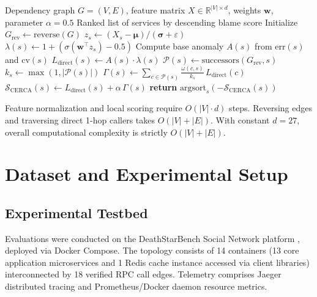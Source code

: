 \documentclass[conference]{IEEEtran}
\begin{document}
\begin{algorithm}[!t]
\caption{CERCA Root Cause Inference}
\label{alg:cerca}
\begin{algorithmic}[1]
\REQUIRE Dependency graph $G=(V,E)$, feature matrix $X\in\mathbb{R}^{|V|\times d}$, weights $\mathbf{w}$, parameter $\alpha=0.5$
\ENSURE Ranked list of services by descending blame score
\STATE Initialize $G_{\mathrm{rev}}\leftarrow \mathrm{reverse}(G)$
    \STATE $z_s\leftarrow(X_s-\boldsymbol{\mu})/(\boldsymbol{\sigma}+\varepsilon)$
    \STATE $\lambda(s)\leftarrow 1+(\sigma(\mathbf{w}^{\top}z_s)-0.5)$
    \STATE Compute base anomaly $A(s)$ from $\mathrm{err}(s)$ and $\mathrm{cv}(s)$
    \STATE $L_{\mathrm{direct}}(s)\leftarrow A(s)\cdot\lambda(s)$
\ENDFOR
{}
    \STATE $\mathcal{P}(s)\leftarrow \mathrm{successors}(G_{\mathrm{rev}}, s)$ 
    \STATE $k_s\leftarrow \max(1, |\mathcal{P}(s)|)$
    \STATE $\Gamma(s)\leftarrow \sum_{c\in\mathcal{P}(s)} \frac{\omega(c,s)}{k_s}\,L_{\mathrm{direct}}(c)$
    \STATE $\mathcal{S}_{\mathrm{CERCA}}(s)\leftarrow L_{\mathrm{direct}}(s)+\alpha\,\Gamma(s)$
\ENDFOR
\STATE \textbf{return} $\mathrm{argsort}_s(-\mathcal{S}_{\mathrm{CERCA}}(s))$
\end{algorithmic}
\end{algorithm}

Feature normalization and local scoring require $O(|V|\cdot d)$ steps. Reversing edges and traversing direct 1-hop callers takes $O(|V|+|E|)$. With constant $d=27$, overall computational complexity is strictly $O(|V|+|E|)$.

\section{Dataset and Experimental Setup}

\subsection{Experimental Testbed}
Evaluations were conducted on the DeathStarBench Social Network platform \cite{gan2019}, deployed via Docker Compose. The topology consists of 14 containers (13 core application microservices and 1 Redis cache instance accessed via client libraries) interconnected by 18 verified RPC call edges. Telemetry comprises Jaeger distributed tracing and Prometheus/Docker daemon resource metrics.
\end{document}
